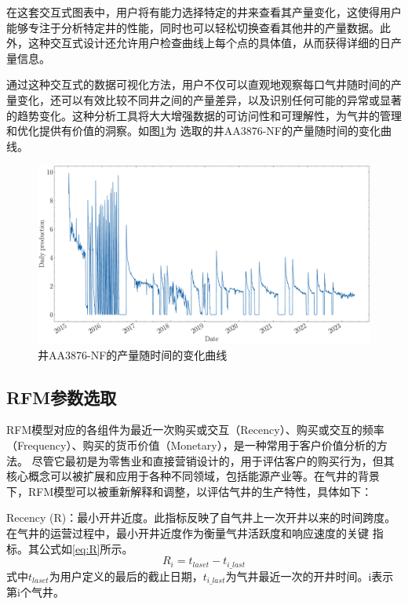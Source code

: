 在这套交互式图表中，用户将有能力选择特定的井来查看其产量变化，这使得用户能够专注于分析特定井的性能，同时也可以轻松切换查看其他井的产量数据。此外，这种交互式设计还允许用户检查曲线上每个点的具体值，从而获得详细的日产量信息。

通过这种交互式的数据可视化方法，用户不仅可以直观地观察每口气井随时间的产量变化，还可以有效比较不同井之间的产量差异，以及识别任何可能的异常或显著的趋势变化。这种分析工具将大大增强数据的可访问性和可理解性，为气井的管理和优化提供有价值的洞察。如图\ref{fig:dailychange}为
选取的井AA3876-NF的产量随时间的变化曲线。
\begin{figure}[H]
    \centering
    \includegraphics[width=.9\linewidth]{figure/DailyProduction_SN0004-04.pdf}
    \caption{井AA3876-NF的产量随时间的变化曲线}
    \label{fig:dailychange}
\end{figure}


\subsection{RFM参数选取}
RFM模型对应的各组件为最近一次购买或交互（Recency）、购买或交互的频率（Frequency）、购买的货币价值（Monetary），是一种常用于客户价值分析的方法。
尽管它最初是为零售业和直接营销设计的，用于评估客户的购买行为，但其核心概念可以被扩展和应用于各种不同领域，包括能源产业等。在气井的背景
下，RFM模型可以被重新解释和调整，以评估气井的生产特性，具体如下：

Recency (R)：最小开井近度。此指标反映了自气井上一次开井以来的时间跨度。在气井的运营过程中，最小开井近度作为衡量气井活跃度和响应速度的关键
指标。其公式如\eqref{eq:R}所示。
\begin{equation}
    R_i = t_{laset} - t_{i\_last}
    \label{eq:R}
\end{equation}
式中$t_{laset}$为用户定义的最后的截止日期，$t_{i\_last}$为气井最近一次的开井时间。i表示第i个气井。

